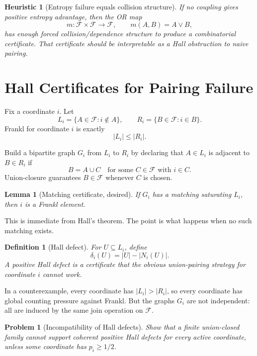 \documentclass[11pt]{article}
\newtheorem{problem}{Problem}
\newtheorem{lemma}{Lemma}
\newtheorem{heuristic}{Heuristic}
\newtheorem{definition}{Definition}
\begin{document}
\begin{heuristic}[Entropy failure equals collision structure]
If no coupling gives positive entropy advantage, then the OR map
\[
  m:\mathcal{F}\times\mathcal{F}\to\mathcal{F},
  \qquad
  m(A,B)=A\vee B,
\]
has enough forced collision/dependence structure to produce a combinatorial
certificate.  That certificate should be interpretable as a Hall obstruction
to naive pairing.
\end{heuristic}

\section{Hall Certificates for Pairing Failure}

Fix a coordinate $i$.  Let
\[
  L_i = \{A\in\mathcal{F}: i\notin A\},
  \qquad
  R_i = \{B\in\mathcal{F}: i\in B\}.
\]
Frankl for coordinate $i$ is exactly
\[
  |L_i| \leq |R_i|.
\]

Build a bipartite graph $G_i$ from $L_i$ to $R_i$ by declaring that
$A\in L_i$ is adjacent to $B\in R_i$ if
\[
  B=A\cup C
  \quad \text{for some } C\in\mathcal{F} \text{ with } i\in C.
\]
Union-closure guarantees $B\in\mathcal{F}$ whenever $C$ is chosen.

\begin{lemma}[Matching certificate, desired]
If $G_i$ has a matching saturating $L_i$, then $i$ is a Frankl element.
\end{lemma}

This is immediate from Hall's theorem.  The point is what happens when no such
matching exists.

\begin{definition}[Hall defect]
For $U\subseteq L_i$, define
\[
  \delta_i(U)=|U|-|N_i(U)|.
\]
A positive Hall defect is a certificate that the obvious union-pairing strategy
for coordinate $i$ cannot work.
\end{definition}

In a counterexample, every coordinate has $|L_i|>|R_i|$, so every coordinate
has global counting pressure against Frankl.  But the graphs $G_i$ are not
independent: all are induced by the same join operation on $\mathcal{F}$.

\begin{problem}[Incompatibility of Hall defects]
Show that a finite union-closed family cannot support coherent positive Hall
defects for every active coordinate, unless some coordinate has
$p_i\geq 1/2$.
\end{problem}
\end{document}
